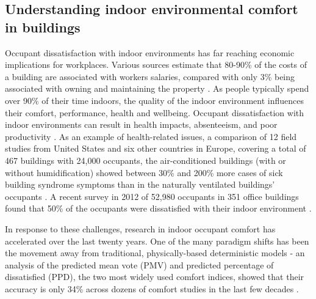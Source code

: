\documentclass[]{interact}
\theoremstyle{plain}%
\theoremstyle{definition}
\theoremstyle{remark}
\begin{document}
  





\subsection{Understanding indoor environmental comfort in buildings}
Occupant dissatisfaction with indoor environments has far reaching economic implications for workplaces. Various sources estimate that 80-90\% of the costs of a building are associated with workers salaries, compared with only 3\% being associated with owning and maintaining the property \citep{Creativeandproductiveworkplaces, kats2003green, wilson2005making}. As people typically spend over 90\% of their time indoors, the quality of the indoor environment influences their comfort, performance, health and wellbeing. Occupant dissatisfaction with indoor environments can result in health impacts, absenteeism, and poor productivity \citep{MiltonDonaldK.P.MarkGlencross2000}. As an example of health-related issues, a comparison of 12 field studies from United States and six other countries in Europe, covering a total of 467 buildings with 24,000 occupants, the air-conditioned buildings (with or without humidification) showed between 30\% and 200\% more cases of sick building syndrome symptoms than in the naturally ventilated buildings' occupants \citep{Evolvingopportunities, ventilationsystemtype}. A recent survey in 2012 of 52,980 occupants in 351 office buildings found that 50\% of the occupants were dissatisfied with their indoor environment \citep{Frontczak2012QuantitativeDesign}. 


In response to these challenges, research in indoor occupant comfort has accelerated over the last twenty years. One of the many paradigm shifts has been the movement away from traditional, physically-based deterministic models - an analysis of the predicted mean vote (PMV) and predicted percentage of dissatisfied (PPD), the two most widely used comfort indices, showed that their accuracy is only 34\% across dozens of comfort studies in the last few decades \cite{CHEUNG2019205,FOLDVARYLICINA2018502}.
 
\end{document}
